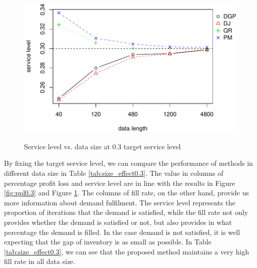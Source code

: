 \documentclass{article}
\begin{document}
\begin{figure}[ht]
\centering
\caption{Service level vs. data size at 0.3 target service level}
\includegraphics{linear-norm-plot_files/figure-latex/sl-3.pdf}
\label{fig:sl0.3}
\end{figure}

By fixing the target service level, we can compare the performance of methods in different data size in Table \ref{tab:size_effect0.3}. The value in columns of percentage profit loss and service level are in line with the results in Figure \ref{fig:ppl0.3} and Figure \ref{fig:sl0.3}. The columns of fill rate, on the other hand, provide us more information about demand fulfilment. The service level represents the proportion of iterations that the demand is satisfied, while the fill rate not only provides whether the demand is satisfied or not, but also provides in what percentage the demand is filled. In the case demand is not satisfied, it is well expecting that the gap of inventory is as small as possible. In Table \ref{tab:size_effect0.3}, we can see that the proposed method maintains a very high fill rate in all data size. 
\end{document}
